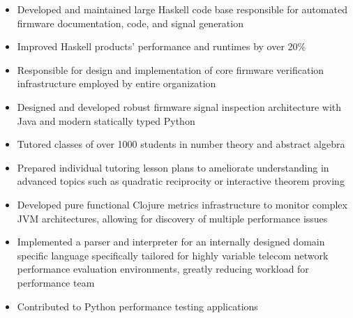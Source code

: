 \documentclass[10pt,a4paper]{altacv}
\newenvironment{tightitemize} %
{\begin{itemize}\itemsep1pt \parskip0pt \parsep0pt}
{\end{itemize}\vspace{-\topsep}}
\begin{document}
\begin{tightitemize}
\item Developed and maintained large Haskell code base responsible for automated firmware 
    documentation, code, and signal generation
\item Improved Haskell products' performance and runtimes by over 20\%
\item Responsible for design and implementation of core firmware
    verification infrastructure employed by entire organization
\item Designed and developed robust firmware signal inspection architecture with 
    Java and modern statically typed Python
\end{tightitemize}

\smallskip
\divider

\begin{tightitemize}
\item Tutored classes of over 1000 students in number theory and abstract algebra
\item Prepared individual tutoring lesson plans to ameliorate 
    understanding in advanced topics such as quadratic reciprocity or 
    interactive theorem proving
\end{tightitemize}

\smallskip
\divider

\begin{tightitemize}
    \item Developed pure functional Clojure metrics infrastructure to monitor 
        complex JVM architectures, allowing for discovery of multiple 
        performance issues
    \item Implemented a parser and interpreter for an internally designed domain 
        specific language specifically tailored for highly variable telecom 
        network performance evaluation environments, greatly reducing workload 
        for performance team
    \item Contributed to Python performance testing applications
\end{tightitemize}
\end{document}
